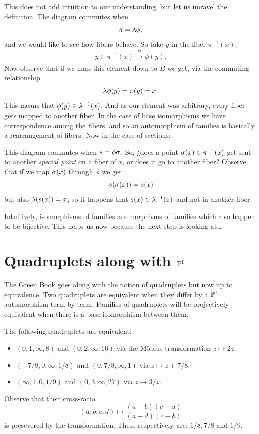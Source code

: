\documentclass[12pt]{memoir}
\begin{document}
This does not add intuition to our understanding, but let us unravel the definition. The diagram commutes when 
$$\pi=\lambda\phi,$$
and we would like to see how fibers behave. So take $y$ in the fiber $\pi^{-1}(x)$,
$$y\in\pi^{-1}(x)\xrightarrow[]{\phi}\phi(y).$$
Now observe that if we map this element down to $B$ we get, via the commuting relationship
$$\lambda\phi(y)=\pi(y)=x.$$
This means that $\phi(y)\in\lambda^{-1}(x)$. And as our element was arbitrary, every fiber gets mapped to another fiber. In the case of base isomorphisms we have correspondence among the fibers, and so an automorphism of families is basically a rearrangement of fibers.
Now in the case of sections:
\begin{center}
\end{center}
This diagram commutes when $s=\phi\sigma$. So, ¿does a point $\sigma(x)\in\pi^{-1}(x)$ get sent to another \emph{special point} on a fiber of $x$, or does it go to another fiber? Observe that if we map $\sigma(x)$ through $\phi$ we get 
$$\phi(\sigma(x))=s(x)$$
but also $\lambda(s(x))=x$, so it happens that $s(x)\in\lambda^{-1}(x)$ and not in another fiber.

Intuitively, isomorphisms of families are morphisms of families which also happen to be bijective. This helps us now because the next step is looking at\dots

\section{Quadruplets along with $\mathbb{P}^1$}

The Green Book goes along with the notion of quadruplets but now up to equivalence. Two quadruplets are equivalent when they differ by a $\mathbb{P}^1$ automorphism term-by-term. Families of quadruplets will be projectively equivalent when there is a base-isomorphism between them.

\begin{Ex}
    The following quadruplets are equivalent:
    \begin{itemize}
        \item $(0,1,\infty,8)$ and $(0,2,\infty,16)$ via the M\"obius transformation $z\mapsto 2z$. 
        \item $(-7/8,0,\infty,1/8)$ and $(0,7/8,\infty,1)$ via $z\mapsto z+7/8$.
        \item $(\infty,1,0,1/9)$ and $(0,3,\infty,27)$ via $z\mapsto 3/z$.
    \end{itemize}
    Observe that their cross-ratio 
    $$(a,b,c,d)\mapsto\frac{(a-b)(c-d)}{(a-d)(c-b)}$$
    is presevered by the transformation. These respectively are: $1/8,7/8$ and $1/9$.
\end{Ex}
\end{document}
